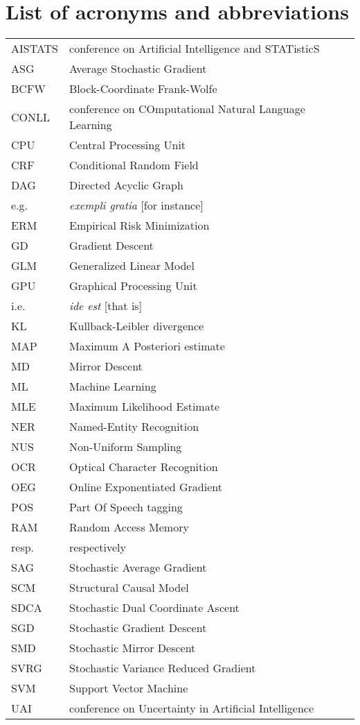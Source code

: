 \documentclass[12pt]{report} %
\numberwithin{equation}{chapter}
\numberwithin{table}{chapter}
\numberwithin{figure}{chapter}
\begin{document}
\chapter*{List of acronyms and abbreviations}
\begin{tabular}{lll}
  AISTATS & conference on Artificial Intelligence and STATisticS \\
  ASG & Average Stochastic Gradient \\
  BCFW & Block-Coordinate Frank-Wolfe \\
  CONLL & conference on COmputational Natural Language Learning \\
  CPU & Central Processing Unit \\
  CRF & Conditional Random Field \\
  DAG & Directed Acyclic Graph \\
  e.g. & \emph{exempli gratia} [for instance]\\
  ERM & Empirical Risk Minimization \\
  GD & Gradient Descent \\
  GLM & Generalized Linear Model \\
  GPU & Graphical Processing Unit \\
  i.e.& \emph{ide est} [that is]\\
  KL & Kullback-Leibler divergence \\
  MAP & Maximum A Posteriori estimate \\
  MD & Mirror Descent \\
  ML & Machine Learning \\
  MLE & Maximum Likelihood Estimate \\
  NER & Named-Entity Recognition \\
  NUS & Non-Uniform Sampling \\
  OCR & Optical Character Recognition \\
  OEG & Online Exponentiated Gradient \\
  POS & Part Of Speech tagging \\
  RAM & Random Access Memory \\
  resp. & respectively \\
  SAG & Stochastic Average Gradient \\
  SCM & Structural Causal Model \\
  SDCA & Stochastic Dual Coordinate Ascent \\
  SGD & Stochastic Gradient Descent \\
  SMD & Stochastic Mirror Descent\\
  SVRG & Stochastic Variance Reduced Gradient \\
  SVM & Support Vector Machine\\
  UAI & conference on Uncertainty in Artificial Intelligence \\
\end{tabular}
\end{document}
